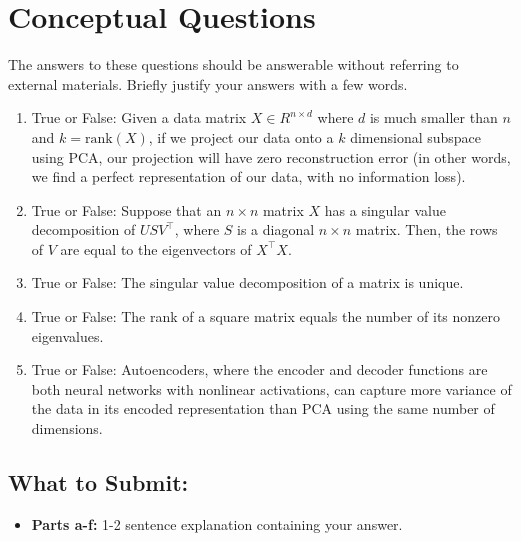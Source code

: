 \documentclass{article}
\begin{document}
\section*{Conceptual Questions}
\begin{aprob}  The answers to these questions should be answerable without referring to external materials. Briefly justify your answers with a few words.
    \begin{enumerate}
      \item {} True or False: Given a data matrix $X \in R^{n \times d}$ where $d$ is much smaller than $n$ and $k = \textrm{rank}(X)$, if we project our data onto a $k$ dimensional subspace using PCA, our projection will have zero reconstruction error (in other words, we find a perfect representation of our data, with no information loss).
      \item {} True or False: Suppose that an $n \times n$ matrix $X$ has a singular value decomposition of $USV^{\top}$, where $S$ is a diagonal $n \times n$ matrix. Then, the rows of $V$ are equal to the eigenvectors of $X^{\top}X$.
    	\item {} True or False: The singular value decomposition of a matrix is unique. 
    	\item {} True or False: The rank of a square matrix equals the number of its nonzero eigenvalues. 
      \item {} True or False: Autoencoders, where the encoder and decoder functions are both neural networks with nonlinear activations, can capture more variance of the data in its encoded representation than  PCA using the same number of dimensions.
    \end{enumerate}

    \subsection*{What to Submit:}
    \begin{itemize}
        \item \textbf{Parts a-f:} 1-2 sentence explanation containing your answer.
    \end{itemize}

\end{aprob}
\pagebreak
\end{document}
